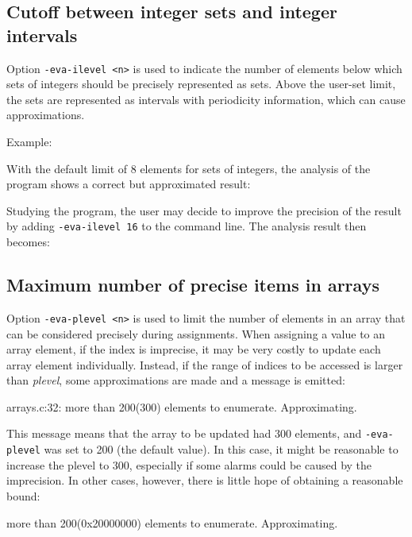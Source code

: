 \documentclass{frama-c-book}
\begin{document}
\subsection{Cutoff between integer sets and integer intervals}

Option \verb|-eva-ilevel <n>| is used to indicate the number of elements
below which sets of integers should be precisely represented as sets.
Above the user-set limit, the sets are represented as intervals
with periodicity information, which can cause approximations.

Example:

With the default limit of 8 elements for sets of integers, the
analysis of the program shows a correct but approximated result:


Studying the program, the user may decide to improve the precision of
the result by adding \verb|-eva-ilevel 16| to the command line. The
analysis result then becomes:


\subsection{Maximum number of precise items in arrays}

Option \verb|-eva-plevel <n>| is used to limit the number of elements
in an array that can be considered precisely during assignments.
When assigning a value to an array element, if the index is imprecise,
it may be very costly to update each array element individually.
Instead, if the range of indices to be accessed is larger than {\em plevel},
some approximations are made and a message is emitted:

\begin{listing-log}
[kernel] arrays.c:32:
  more than 200(300) elements to enumerate. Approximating.
\end{listing-log}

This message means that the array to be updated had 300 elements, and
\verb|-eva-plevel| was set to 200 (the default value). In this case, it
might be reasonable to increase the plevel to 300, especially if some alarms
could be caused by the imprecision. In other cases, however, there is little
hope of obtaining a reasonable bound:

\begin{listing-log}
more than 200(0x20000000) elements to enumerate. Approximating.
\end{listing-log}
\end{document}

